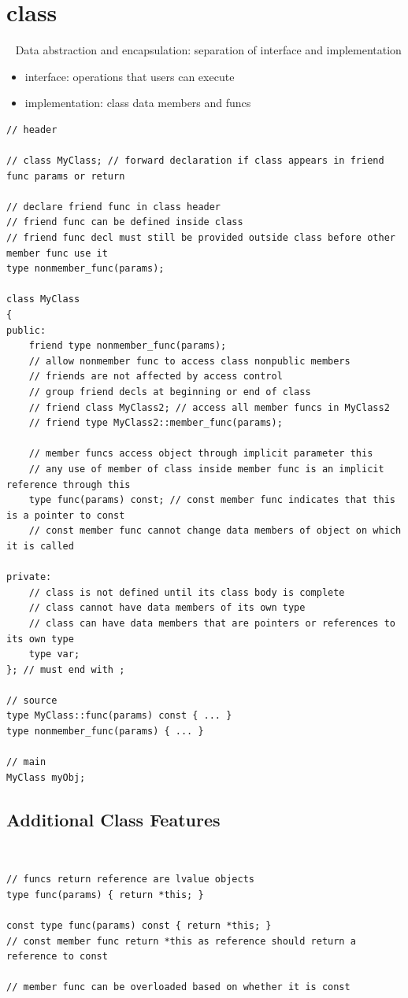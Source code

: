 \documentclass{blog}
\begin{document}
\section{class}
\begin{definition}[class]~
    Data abstraction and encapsulation: separation of interface and implementation
    \begin{itemize}
        \item interface: operations that users can execute
        \item implementation: class data members and funcs
    \end{itemize}

    \begin{verbatim}
// header

// class MyClass; // forward declaration if class appears in friend func params or return

// declare friend func in class header
// friend func can be defined inside class
// friend func decl must still be provided outside class before other member func use it
type nonmember_func(params);

class MyClass
{
public:
    friend type nonmember_func(params);
    // allow nonmember func to access class nonpublic members
    // friends are not affected by access control
    // group friend decls at beginning or end of class
    // friend class MyClass2; // access all member funcs in MyClass2
    // friend type MyClass2::member_func(params);

    // member funcs access object through implicit parameter this
    // any use of member of class inside member func is an implicit reference through this
    type func(params) const; // const member func indicates that this is a pointer to const
    // const member func cannot change data members of object on which it is called

private:
    // class is not defined until its class body is complete
    // class cannot have data members of its own type
    // class can have data members that are pointers or references to its own type
    type var;
}; // must end with ;

// source
type MyClass::func(params) const { ... }
type nonmember_func(params) { ... }

// main
MyClass myObj;
\end{verbatim}
\end{definition}

\subsection{Additional Class Features}
\begin{definition}[this]~
    \begin{verbatim}
// funcs return reference are lvalue objects
type func(params) { return *this; }

const type func(params) const { return *this; }
// const member func return *this as reference should return a reference to const

// member func can be overloaded based on whether it is const
\end{verbatim}
\end{definition}
\end{document}

